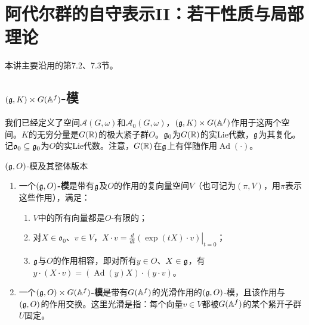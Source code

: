 \chapter{阿代尔群的自守表示II：若干性质与局部理论}\label{L5}
本讲主要沿用的第7.2、7.3节。
\section{\texorpdfstring{$(\mathfrak{g},K)\times G(\mathbb{A}^f)$-模}{(g,K)×G(Aᶠ)-模}}\label{L5S1}
我们已经定义了空间$\mathcal A(G,\omega)$和$\mathcal A_0(G,\omega)$，$(\mathfrak{g},K)\times G(\mathbb{A}^f)$作用于这两个空间。$K$的无穷分量是$G(\mathbb{R})$的极大紧子群$O$。$\mathfrak{g}_0$为$G(\mathbb{R})$的实Lie代数，$\mathfrak{g}$为其复化。记$\mathfrak{o}_0\subseteq\mathfrak{g}_0$为$O$的实Lie代数。注意，$G(\mathbb{R})$在$\mathfrak{g}$上有伴随作用$\operatorname{Ad}(\cdot)$。
\begin{definition}{$(\mathfrak{g},O)$-模及其整体版本}\label{L5S1O1}
\begin{enumerate}
\item 一个\textbf{$(\mathfrak{g},O)$-模}是带有$\mathfrak{g}$及$O$的作用的复向量空间$V$（也可记为$(\pi,V)$，用$\pi$表示这些作用），满足：
\begin{enumerate}[label=(\arabic*)]
\item $V$中的所有向量都是$O$-有限的；
\item 对$X\in\mathfrak{o}_0$、$v\in V$，$X\cdot v=\left.\frac d{dt}(\exp(tX)\cdot v)\right|_{t=0}$；
\item $\mathfrak{g}$与$O$的作用相容，即对所有$y\in O$、$X\in\mathfrak{g}$，有$y\cdot(X\cdot v)=(\operatorname{Ad}(y)X)\cdot(y\cdot v)$。
\end{enumerate}
\item 一个\textbf{$(\mathfrak{g},O)\times G(\mathbb{A}^f)$-模}是带有$G(\mathbb{A}^f)$的光滑作用的$(\mathfrak{g},O)$-模，且该作用与$(\mathfrak{g},O)$的作用交换。这里光滑是指：每个向量$v\in V$都被$G(\mathbb{A}^f)$的某个紧开子群$U$固定。
\end{enumerate}
\end{definition}
